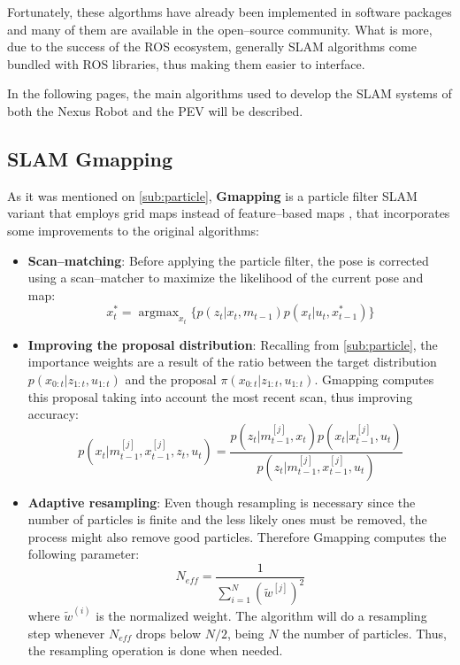 Fortunately, these algorthms have already been implemented in software packages and many of them are available in the open--source community. What is more, due to the success of the ROS ecosystem, generally SLAM algorithms come bundled with ROS libraries, thus making them easier to interface.

In the following pages, the main algorithms used to develop the SLAM systems of both the Nexus Robot and the PEV will be described.

\subsection{SLAM Gmapping} \label{sub:gmapping}

As it was mentioned on \autoref{sub:particle}, \textbf{Gmapping} is a particle filter SLAM variant that employs grid maps instead of feature--based maps , that incorporates some improvements to the original algorithms:
\begin{itemize}
  \item \textbf{Scan--matching}: Before applying the particle filter, the pose is corrected using a scan--matcher to maximize the likelihood of the current pose and map:
  \begin{equation}
    x_t^* = \mathop{argmax}_{x_t}\{p(z_t|x_t,m_{t-1})p(x_t|u_t,x^*_{t-1})\}
    \label{eq:scanmatch}
  \end{equation}  

  \item \textbf{Improving the proposal distribution}: Recalling from \autoref{sub:particle}, the importance weights are a result of the ratio between the target distribution $p(x_{0:t}|z_{1:t},u_{1:t})$ and the proposal $\pi(x_{0:t}|z_{1:t},u_{1:t})$. Gmapping computes this proposal taking into account the most recent scan, thus improving accuracy:
  \begin{equation}
    p(x_t|m_{t-1}^{[j]},x^{[j]}_{t-1},z_t,u_{t})=\frac{p(z_t|m_{t-1}^{[j]},x_t)p(x_t|x_{t-1}^{[j]},u_t)}{p(z_t|m_{t-1}^{[j]},x_{t-1}^{[j]},u_t)}
    \label{eq:improvedprop}
  \end{equation}

  \item \textbf{Adaptive resampling}: Even though resampling is necessary since the number of particles is finite and the less likely ones must be removed, the process might also remove good particles. Therefore Gmapping computes the following parameter:
  \begin{equation}
    N_{eff} = \frac{1}{\sum_{i=1}^{N}(\tilde{w}^{[j]})^2}
    \label{eq:neff}
  \end{equation}
  where $\tilde{w}^{(i)}$ is the normalized weight. The algorithm will do a resampling step whenever $N_{eff}$ drops below $N/2$, being $N$ the number of particles. Thus, the resampling operation is done when needed.
\end{itemize}  


